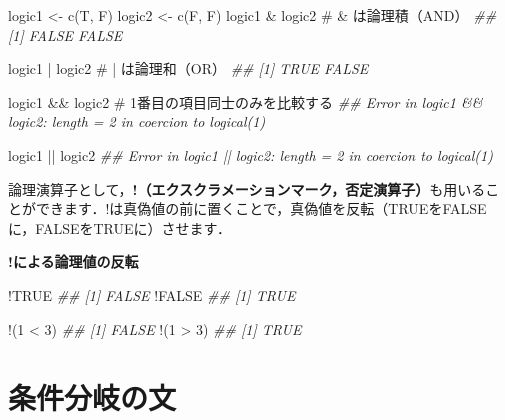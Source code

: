 \documentclass[
  letterpaper,
  DIV=11,
  numbers=noendperiod]{scrreprt}
\newenvironment{Shaded}{\begin{snugshade}}{\end{snugshade}}
\newcommand{\CommentTok}[1]{\textcolor[rgb]{0.37,0.37,0.37}{#1}}
\newcommand{\ConstantTok}[1]{\textcolor[rgb]{0.56,0.35,0.01}{#1}}
\newcommand{\DecValTok}[1]{\textcolor[rgb]{0.68,0.00,0.00}{#1}}
\newcommand{\DocumentationTok}[1]{\textcolor[rgb]{0.37,0.37,0.37}{\textit{#1}}}
\newcommand{\FunctionTok}[1]{\textcolor[rgb]{0.28,0.35,0.67}{#1}}
\newcommand{\NormalTok}[1]{\textcolor[rgb]{0.00,0.23,0.31}{#1}}
\newcommand{\OtherTok}[1]{\textcolor[rgb]{0.00,0.23,0.31}{#1}}
\newcommand{\SpecialCharTok}[1]{\textcolor[rgb]{0.37,0.37,0.37}{#1}}
\begin{document}
\textbf{}

\begin{Shaded}
\begin{Highlighting}[]
\NormalTok{logic1 }\OtherTok{\textless{}{-}} \FunctionTok{c}\NormalTok{(T, F)}
\NormalTok{logic2 }\OtherTok{\textless{}{-}} \FunctionTok{c}\NormalTok{(F, F)}
\NormalTok{logic1 }\SpecialCharTok{\&}\NormalTok{ logic2 }\CommentTok{\# \& は論理積（AND）}
\DocumentationTok{\#\# [1] FALSE FALSE}

\NormalTok{logic1 }\SpecialCharTok{|}\NormalTok{ logic2 }\CommentTok{\# | は論理和（OR）}
\DocumentationTok{\#\# [1]  TRUE FALSE}

\NormalTok{logic1 }\SpecialCharTok{\&\&}\NormalTok{ logic2 }\CommentTok{\# 1番目の項目同士のみを比較する}
\DocumentationTok{\#\# Error in logic1 \&\& logic2: \textquotesingle{}length = 2\textquotesingle{} in coercion to \textquotesingle{}logical(1)\textquotesingle{}}

\NormalTok{logic1 }\SpecialCharTok{||}\NormalTok{ logic2}
\DocumentationTok{\#\# Error in logic1 || logic2: \textquotesingle{}length = 2\textquotesingle{} in coercion to \textquotesingle{}logical(1)\textquotesingle{}}
\end{Highlighting}
\end{Shaded}

論理演算子として，\textbf{!（エクスクラメーションマーク，否定演算子）}も用いることができます．!は真偽値の前に置くことで，真偽値を反転（TRUEをFALSEに，FALSEをTRUEに）させます．

\textbf{!による論理値の反転}

\begin{Shaded}
\begin{Highlighting}[]
\SpecialCharTok{!}\ConstantTok{TRUE}
\DocumentationTok{\#\# [1] FALSE}
\SpecialCharTok{!}\ConstantTok{FALSE}
\DocumentationTok{\#\# [1] TRUE}

\SpecialCharTok{!}\NormalTok{(}\DecValTok{1} \SpecialCharTok{\textless{}} \DecValTok{3}\NormalTok{)}
\DocumentationTok{\#\# [1] FALSE}
\SpecialCharTok{!}\NormalTok{(}\DecValTok{1} \SpecialCharTok{\textgreater{}} \DecValTok{3}\NormalTok{)}
\DocumentationTok{\#\# [1] TRUE}
\end{Highlighting}
\end{Shaded}

\hypertarget{ux6761ux4ef6ux5206ux5c90ux306eux6587}{%
\section{条件分岐の文}\label{ux6761ux4ef6ux5206ux5c90ux306eux6587}}
\end{document}
